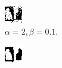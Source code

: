 \documentclass{article}
\begin{document}
\begin{figure}[t]
\centering
\begin{subfigure}[t]{0.25\textwidth}
  \centering
  \includegraphics[width=\textwidth]{ii_alpha_2_beta_0.1.bmp}
  \vspace{-0.6cm}
  \caption{$\alpha=2, \beta=0.1$.}
  \label{f:ii-1}
\end{subfigure}
\begin{subfigure}[t]{0.25\textwidth}
  \centering
  \includegraphics[width=\textwidth]{ii_alpha_5_beta_0.1.bmp}

\end{subfigure}
\end{figure}
\end{document}
